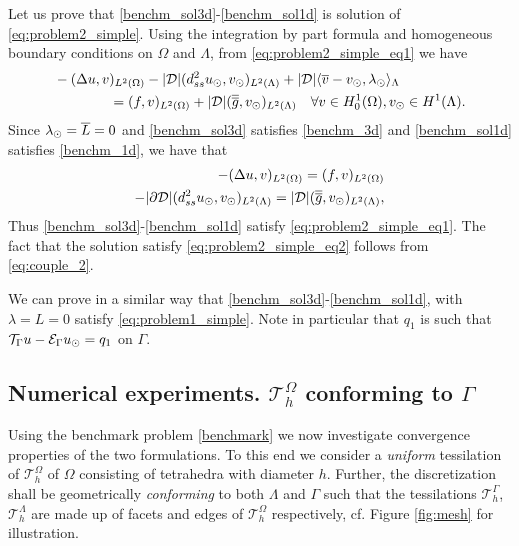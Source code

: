 Let us prove that \eqref{benchm_sol3d}-\eqref{benchm_sol1d} is solution of
\eqref{eq:problem2_simple}. Using the integration by part formula and homogeneous
boundary conditions on $\Omega$ and $\Lambda$, from \eqref{eq:problem2_simple_eq1} we have
\begin{align*}
&-(\Delta u, v)_{L^2(\Omega)} - |{\cal D}|(d^2_{ss} \ud, \vd)_{L^2(\Lambda)} 
+ |{\cal D}|\langle \avrc{v}  - \vd, \ld \rangle_\Lambda
\\
\nonumber
&\qquad\qquad= (f,v)_{L^2(\Omega)} + |{\cal D}| (\avrd{g},\vd)_{L^2(\Lambda)}
\quad \forall v \in H^1_0(\Omega), \vd \in H^1(\Lambda).
\\
\end{align*}
Since $\lambda_{\odot}=\overline{L}=0$ and \eqref{benchm_sol3d} satisfies \eqref{benchm_3d} and \eqref{benchm_sol1d}
satisfies \eqref{benchm_1d}, we have that
\begin{align*}
-(\Delta u, v)_{L^2(\Omega)} =  (f,v)_{L^2(\Omega)} \\
-|{\partial \cal D}|(d^2_{ss} \ud, \vd)_{L^2(\Lambda)}  = |{\cal D}| (\avrd{g},\vd)_{L^2(\Lambda)},
\end{align*}
Thus \eqref{benchm_sol3d}-\eqref{benchm_sol1d} satisfy \eqref{eq:problem2_simple_eq1}.
The fact that the solution satisfy \eqref{eq:problem2_simple_eq2} follows from \eqref{eq:couple_2}.

We can prove in a similar way that \eqref{benchm_sol3d}-\eqref{benchm_sol1d}, with $\lambda=L=0$
satisfy \eqref{eq:problem1_simple}. Note in particular that $q_1$ is such that
${\mathcal{T}_\Gamma}{u} - \mathcal{E}_\Gamma{u_{\odot}} = q_1$ on $\Gamma$.

\subsection{Numerical experiments. $\mathcal{T}^{\Omega}_h$ conforming to $\Gamma$}\label{sec:experiment_conform}
Using the benchmark problem \eqref{benchmark} we now investigate convergence
properties of the two formulations. To this end we consider a \emph{uniform} tessilation
of $\mathcal{T}^{\Omega}_h$ of $\Omega$ consisting of tetrahedra with diameter $h$.
Further, the discretization shall be geometrically \emph{conforming} to both $\Lambda$
and $\Gamma$ such that the tessilations $\mathcal{T}^{\Gamma}_h$, $\mathcal{T}^{\Lambda}_h$
are made up of facets and edges of $\mathcal{T}^{\Omega}_h$ respectively, cf. Figure \ref{fig:mesh}
for illustration.


